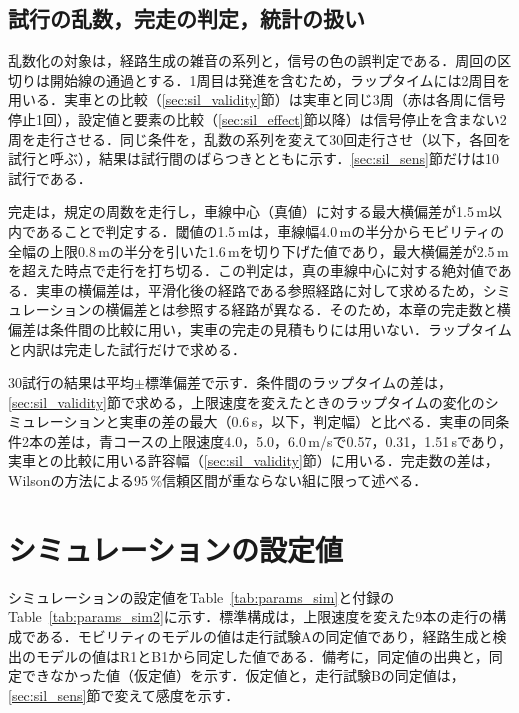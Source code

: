 \subsection{試行の乱数，完走の判定，統計の扱い}
\label{sec:sil_run}
乱数化の対象は，経路生成の雑音の系列と，信号の色の誤判定である．周回の区切りは開始線の通過とする．1周目は発進を含むため，ラップタイムには2周目を用いる．実車との比較（\ref{sec:sil_validity}節）は実車と同じ3周（赤は各周に信号停止1回），設定値と要素の比較（\ref{sec:sil_effect}節以降）は信号停止を含まない2周を走行させる．同じ条件を，乱数の系列を変えて30回走行させ（以下，各回を試行と呼ぶ），結果は試行間のばらつきとともに示す．\ref{sec:sil_sens}節だけは10試行である．

完走は，規定の周数を走行し，車線中心（真値）に対する最大横偏差が1.5\,m以内であることで判定する．閾値の1.5\,mは，車線幅4.0\,mの半分からモビリティの全幅の上限0.8\,mの半分を引いた1.6\,mを切り下げた値であり，最大横偏差が2.5\,mを超えた時点で走行を打ち切る．この判定は，真の車線中心に対する絶対値である．実車の横偏差は，平滑化後の経路である参照経路に対して求めるため，シミュレーションの横偏差とは参照する経路が異なる．そのため，本章の完走数と横偏差は条件間の比較に用い，実車の完走の見積もりには用いない．ラップタイムと内訳は完走した試行だけで求める．

30試行の結果は平均$\pm$標準偏差で示す．条件間のラップタイムの差は，\ref{sec:sil_validity}節で求める，上限速度を変えたときのラップタイムの変化のシミュレーションと実車の差の最大（0.6\,s，以下，判定幅）と比べる．実車の同条件2本の差は，青コースの上限速度4.0，5.0，6.0\,m/sで0.57，0.31，1.51\,sであり，実車との比較に用いる許容幅（\ref{sec:sil_validity}節）に用いる．完走数の差は，Wilsonの方法による95\,\%信頼区間が重ならない組に限って述べる．

\section{シミュレーションの設定値}
\label{sec:params_sim}
シミュレーションの設定値をTable~\ref{tab:params_sim}と付録のTable~\ref{tab:params_sim2}に示す．標準構成は，上限速度を変えた9本の走行の構成である．モビリティのモデルの値は走行試験Aの同定値であり，経路生成と検出のモデルの値はR1とB1から同定した値である．備考に，同定値の出典と，同定できなかった値（仮定値）を示す．仮定値と，走行試験Bの同定値は，\ref{sec:sil_sens}節で変えて感度を示す．

